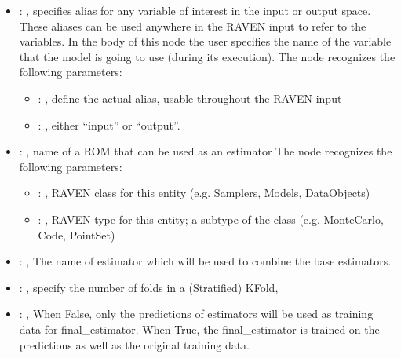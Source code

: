 \begin{itemize}
    \item {}: , 
      specifies alias for         any variable of interest in the input or output space. These
      aliases can be used anywhere in the RAVEN input to         refer to the variables. In the body
      of this node the user specifies the name of the variable that the model is going to use
      (during its execution).
      The  node recognizes the following parameters:
        \begin{itemize}
          \item {}: , 
            define the actual alias, usable throughout the RAVEN input
          \item {}: , 
            either ``input'' or ``output''.
      \end{itemize}

    \item {}: , 
      name of a ROM that can be used as an estimator
      The  node recognizes the following parameters:
        \begin{itemize}
          \item {}: , 
            RAVEN class for this entity (e.g. Samplers, Models, DataObjects)
          \item {}: , 
            RAVEN type for this entity; a subtype of the class (e.g. MonteCarlo, Code, PointSet)
      \end{itemize}

    \item {}: , 
      The name of estimator which will be used to combine the base estimators.

    \item {}: , 
      specify the number of folds in a (Stratified) KFold,

    \item {}: , 
      When False, only the predictions of estimators will be used as training
      data for final\_estimator. When True, the final\_estimator is trained on the predictions
      as well as the original training data.
  \end{itemize}
